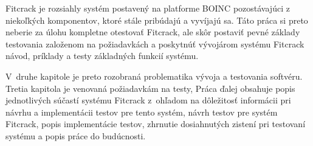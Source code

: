 Fitcrack je rozsiahly systém postavený na platforme BOINC pozostávajúci z niekoľkých komponentov, ktoré stále pribúdajú a vyvíjajú sa.
Táto práca si preto neberie za úlohu kompletne otestovať Fitcrack, ale skôr postaviť pevné základy testovania založenom na požiadavkách a poskytnúť vývojárom systému Fitcrack návod, príklady a testy základných funkcií systému.

V~druhe kapitole je preto rozobraná problematika vývoja a testovania softvéru.
Tretia kapitola je venovaná požiadavkám na testy,
Práca ďalej obsahuje popis jednotlivých súčastí systému Fitcrack z~ohľadom na dôležitosť informácii pri návrhu a implementácii testov pre tento systém, návrh testov pre systém Fitcrack, popis implementácie testov, zhrnutie dosiahnutých zistení pri testovaní systému a popis práce do budúcnosti.


